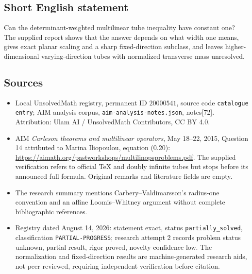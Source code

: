 \documentclass[11pt]{article}
\begin{document}
\subsection{Short English statement}
Can the determinant-weighted multilinear tube inequality have constant one? The supplied report shows that the answer depends on what width one means, gives exact planar scaling and a sharp fixed-direction subclass, and leaves higher-dimensional varying-direction tubes with normalized transverse mass unresolved.
\subsection{Sources}
\begin{itemize}
\item Local UnsolvedMath registry, permanent ID \(20000541\), source code \texttt{catalogue entry}; AIM analysis corpus, \texttt{aim-analysis-notes.json}, notes[72]. Attribution: Ulam AI / UnsolvedMath Contributors, CC BY 4.0.
\item AIM \emph{Carleson theorems and multilinear operators}, May 18--22, 2015, Question 14 attributed to Marina Iliopoulou, equation (0.20): \url{https://aimath.org/pastworkshops/multilinopsproblems.pdf}. The supplied verification refers to official TeX and doubly infinite tubes but stops before its announced full formula. Original remarks and literature fields are empty.
\item The research summary mentions Carbery--Valdimarsson's radius-one convention and an affine Loomis--Whitney argument without complete bibliographic references.
\item Registry dated August 14, 2026: statement exact, status \texttt{partially\_solved}, classification \texttt{PARTIAL-PROGRESS}; research attempt 2 records problem status unknown, partial result, rigor proved, novelty confidence low. The normalization and fixed-direction results are machine-generated research aids, not peer reviewed, requiring independent verification before citation.
\end{itemize}
\end{document}
